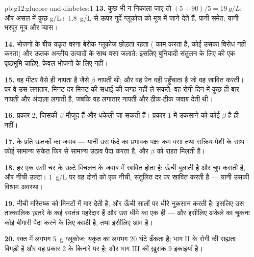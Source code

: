 \begin{solution}{pb:g12:glucose-and-diabetes:1}
\textbf{13.} कुछ भी न निकाला जाए तो $(5 + 90)/5 = \qty{19}{g/L}$; और असल
में कुछ \unit{g/L}। \qty{1.8}{g/L} से ऊपर गुर्दे ग्लूकोज को मूत्र में जाने
देते हैं, पानी समेत: यानी भरपूर मूत्र और प्यास।

\textbf{14.} भोजनों के बीच यकृत वरना बेरोक ग्लूकोज छोड़ता रहता (
काम करता है, कोई उसका विरोध नहीं करता) और ऊतक अम्लीय उत्पादों के साथ वसा
जलाते: इसलिए बुनियादी संतुलन के लिए  की एक पृष्ठभूमि चाहिए, केवल
भोजनों के लिए नहीं।

\textbf{15.} वह मीटर  वैसे ही नापता है जैसे $\beta$  नापती
थी; और वह पेन वही  पहुँचाता है जो वह स्रावित करती। पर वे उस लगातार,
मिनट-दर-मिनट की सधाई की जगह नहीं ले सकते: वह रोगी दिन में कुछ ही बार नापती
और अंदाज़ा लगाती है, जबकि वह  लगातार नापती और ठीक-ठीक जवाब देती थी।

\textbf{16.} प्रकार 2, जिसकी $\beta$  मौजूद हैं और धकेली जा सकती
हैं। प्रकार 1 में उकसाने को कोई $\beta$  है ही नहीं।

\textbf{17.}  के प्रति ऊतकों का जवाब --- यानी उस फंदे का प्रभावक
पक्ष: कम वसा तथा सक्रिय पेशी के साथ कोई सामान्य  संकेत फिर से सामान्य
उठाव पैदा करता है, और $\beta$  को राहत मिलती है।

\textbf{18.} हर एक उसी चर के उल्टे विचलन के जवाब में स्रावित होता है: ऊँची
  बुलाती है और  चुप कराती है, और नीची उल्टा।
\qty{1}{g/L} पर वह  दोनों को एक नीची, संतुलित दर पर स्रावित करती है
--- यानी उसकी विश्राम अवस्था।

\textbf{19.} नीची  मस्तिष्क को मिनटों में मार देती है, और ऊँची
सालों पर धीरे नुक़सान करती है: इसलिए उस तात्कालिक ख़तरे के कई स्वतंत्र
पहरेदार हैं और उस धीमे का एक ही --- और इसीलिए अकेले  का चूकना कोई
बीमारी पैदा करने के लिए काफ़ी है, तथा इसीलिए  आम है।

\textbf{20.} रक्त में लगभग \qty{5}{g} ग्लूकोज; यकृत का  लगभग 20
घंटे ढँकता है; भाग II के रोगी की सह्यता बिगड़ी है और वह प्रकार 2  के
किनारे पर है; और भाग III की ख़ुराक 9 इकाइयाँ है।
\end{solution}
